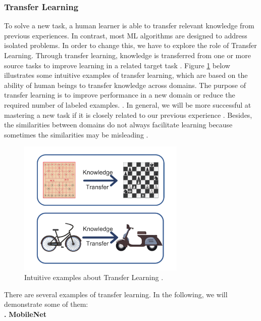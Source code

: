 \documentclass[12pt]{diazessay}
\newcommand{\RomanNumeralCaps}[1]
{\MakeUppercase{\romannumeral #1}}
\begin{document}
    \subsubsection{Transfer Learning}
    \hspace{0.7cm} To solve a new task, a human learner is able to transfer relevant knowledge from previous experiences. In contrast, most ML algorithms are designed to address isolated problems. In order to change this, we have to explore the role of Transfer Learning. Through transfer learning, knowledge is transferred from one or more source tasks to improve learning in a related target task \cite{torrey2010transfer}. Figure \ref{fig:Transfer learning} below illustrates some intuitive examples of transfer learning, which are based on the ability of human beings to transfer knowledge across domains. The purpose of transfer learning is to improve performance in a new domain or reduce the required number of labeled examples. \cite{zhuang2020comprehensive}. In general, we will be more successful at mastering a new task if it is closely related to our previous experience \cite{torrey2010transfer}. Besides, the similarities between domains do not always facilitate learning because sometimes the similarities may be misleading \cite{zhuang2020comprehensive}.
    \begin{figure}[htp]
        \centering
        \includegraphics[width=8cm]{Figures/Transfer learning.png}
        \caption[Intuitive examples about transfer learning]{  Intuitive examples about Transfer Learning \cite{zhuang2020comprehensive}. }
        \label{fig:Transfer learning}
    \end{figure}
    \newpage
    There are several examples of transfer learning. In the following, we will demonstrate some of them:
    \\
    \textbf{\RomanNumeralCaps { 1. }}  \textbf{MobileNet}
   
\end{document}
